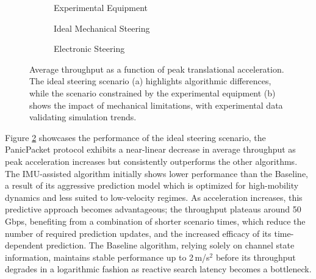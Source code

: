 \documentclass[fleqn,10pt]{wlscirep}
\begin{document}
\begin{figure}[ht!]
    \centering
        \begin{subfigure}{0.32\linewidth}
        
        \vspace{-25 pt}
        \caption{Experimental Equipment}
        \label{fig:trans_exp_rate}
    \end{subfigure}
    \hfill
    \begin{subfigure}{0.32\linewidth}
    
        \vspace{-25 pt}
        \caption{Ideal Mechanical Steering}
        \label{fig:trans_sim_rate}
    \end{subfigure}
    \hfill
    \begin{subfigure}{0.32\linewidth}
        
        \vspace{-25 pt}
        \caption{Electronic Steering}
        \label{fig:trans_simfast_rate}
    \end{subfigure}
    \caption{Average throughput as a function of peak translational acceleration. The ideal steering scenario (a) highlights algorithmic differences, while the scenario constrained by the experimental equipment (b) shows the impact of mechanical limitations, with experimental data validating simulation trends.}
    \label{fig:translational_rate}
\end{figure}

Figure \ref{fig:trans_sim_rate} showcases the performance of the ideal steering scenario, the PanicPacket protocol exhibits a near-linear decrease in average throughput as peak acceleration increases but consistently outperforms the other algorithms. The IMU-assisted algorithm initially shows lower performance than the Baseline, a result of its aggressive prediction model which is optimized for high-mobility dynamics and less suited to low-velocity regimes. As acceleration increases, this predictive approach becomes advantageous; the throughput plateaus around 50\,Gbps, benefiting from a combination of shorter scenario times, which reduce the number of required prediction updates, and the increased efficacy of its time-dependent prediction. The Baseline algorithm, relying solely on channel state information, maintains stable performance up to 2\,m/s$^2$ before its throughput degrades in a logarithmic fashion as reactive search latency becomes a bottleneck.
\end{document}
